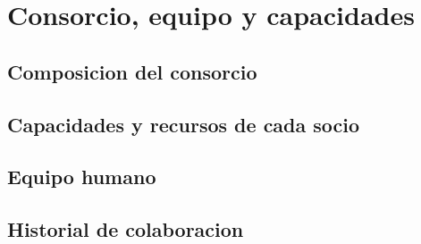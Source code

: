 \section{Consorcio, equipo y capacidades}

\subsection{Composicion del consorcio}

\subsection{Capacidades y recursos de cada socio}

\subsection{Equipo humano}

\subsection{Historial de colaboracion}
